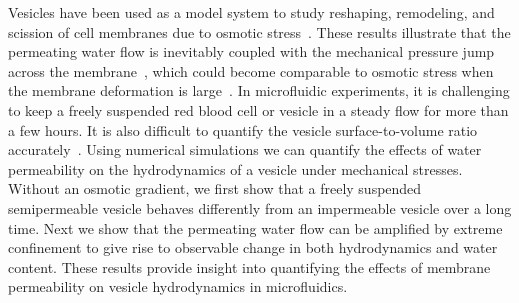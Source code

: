 \documentclass[prb,preprint,showpacs,preprintnumbers,amsmath,amssymb,longbibliography]{revtex4-1}
\begin{document}
Vesicles 
have been used as a
model system to study reshaping, remodeling, and scission of cell
membranes due to osmotic stress~\cite{OgleckaEtAl2014_eLife, BhatiaRobinsonDimova2020_SoftMatt,
CamposSaric2020_bioRxiv, Dimova2020_GVB, BhatiaChrist2020_SoftMatt}.
These results illustrate that the permeating water
flow is inevitably coupled with the mechanical pressure jump across the
membrane~\cite{yao-mor2017}, which could become comparable to osmotic
stress when the membrane deformation is large~\cite{LiMoriSun2015_PRL,
yao-mor2017}. 
%
In microfluidic experiments, it is challenging to keep a freely
suspended red blood cell or vesicle in a steady flow for more than a few
hours. It is also difficult to quantify the vesicle surface-to-volume
ratio accurately~\cite{MinetttiCallensCoupier2008_AppliedOptics}. Using
numerical simulations we can quantify the effects of water permeability
on the hydrodynamics of a vesicle under mechanical stresses.  Without an
osmotic gradient, we first show that a freely suspended semipermeable
vesicle behaves differently from an impermeable vesicle over a long
time. Next we show that
the permeating water flow can be amplified by extreme confinement to give rise to observable change in both hydrodynamics and water content. 
These results provide insight into quantifying the effects of membrane permeability on vesicle hydrodynamics in microfluidics.
%
 
\end{document}
